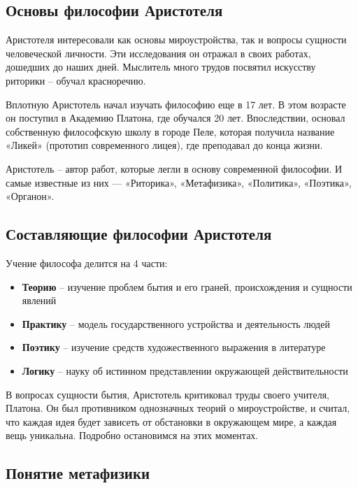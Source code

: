 \documentclass[a4paper, 14pt]{extreport}
\begin{document}
\subsection{Основы философии Аристотеля}

Аристотеля интересовали как основы мироустройства, так и вопросы
сущности человеческой личности. Эти исследования он отражал в своих
работах, дошедших до наших дней. Мыслитель много трудов посвятил
искусству риторики -- обучал красноречию.

Вплотную Аристотель начал изучать философию еще в 17 лет. В этом
возрасте он поступил в Академию Платона, где обучался 20 лет.
Впоследствии, основал собственную философскую школу в городе Пеле,
которая получила название «Ликей» (прототип современного лицея), где
преподавал до конца жизни.

Аристотель -- автор работ, которые легли в основу современной философии.
И самые известные из них --- «Риторика», «Метафизика», «Политика»,
«Поэтика», «Органон».

\subsection{Составляющие философии Аристотеля}

Учение философа делится на 4 части:

\begin{itemize}

\item
  \textbf{Теорию} -- изучение проблем бытия и его граней, происхождения
  и сущности явлений
\item
  \textbf{Практику} -- модель государственного устройства и деятельность
  людей
\item
  \textbf{Поэтику} -- изучение средств художественного выражения в
  литературе
\item
  \textbf{Логику} -- науку об истинном представлении окружающей
  действительности
\end{itemize}

В вопросах сущности бытия, Аристотель критиковал труды своего учителя,
Платона. Он был противником однозначных теорий о мироустройстве, и
считал, что каждая идея будет зависеть от обстановки в окружающем мире,
а каждая вещь уникальна. Подробно остановимся на этих моментах.

\subsection{Понятие метафизики}
\end{document}
